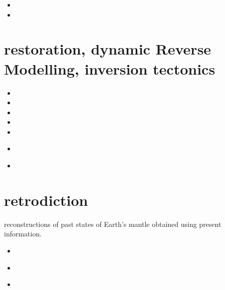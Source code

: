 \begin{small}
\begin{itemize}
\item[2013] 
\item[2025] 
\end{itemize}
\end{small}

\section{restoration, dynamic Reverse Modelling, inversion tectonics}

\begin{small}
\begin{itemize}
\item[\twothousandone] 
\item[\twothousandfour] 
\item[\twothousandfive] 
\item[\twothousandtwelve] 
\item[\twothousandeighteen] 
\item[\twothousandtwenty] 
 \\
\item[\twothousandtwentyfour] 
\end{itemize}
\end{small}


\section{retrodiction}

reconstructions of past states of Earth's mantle obtained using present information.

\begin{small}
\begin{itemize}
\item[2015] \textcite{cobs15}
\item[2018] \textcite{cogb18}
\item[2021] \textcite{ghbo21} 
\end{itemize}
\end{small}










